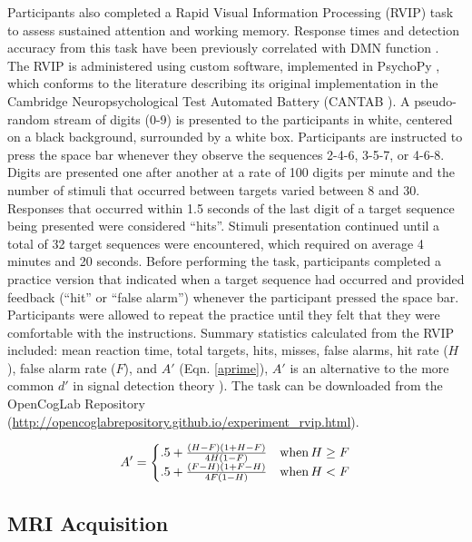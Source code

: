 Participants also completed a Rapid Visual Information Processing (RVIP) task to assess sustained attention and working memory. Response times and detection accuracy from this task have been previously correlated with DMN function \cite{Pagnoni2012}. The RVIP is administered using custom software, implemented in PsychoPy \cite{Peirce2008}, which conforms to the literature describing its original implementation in the Cambridge Neuropsychological Test Automated Battery (CANTAB \cite{Sahakian1992}). A pseudo-random stream of digits (0-9) is presented to the participants in white, centered on a black background, surrounded by a white box. Participants are instructed to press the space bar whenever they observe the sequences 2-4-6, 3-5-7, or 4-6-8. Digits are presented one after another at a rate of 100 digits per minute and the number of stimuli that occurred between targets varied between 8 and 30. Responses that occurred within 1.5 seconds of the last digit of a target sequence being presented were considered “hits”. Stimuli presentation continued until a total of 32 target sequences were encountered, which required on average 4 minutes and 20 seconds. Before performing the task, participants completed a practice version that indicated when a target sequence had occurred and provided feedback (“hit” or “false alarm”) whenever the participant pressed the space bar. Participants were allowed to repeat the practice until they felt that they were comfortable with the instructions. Summary statistics calculated from the RVIP included: mean reaction time, total targets, hits, misses, false alarms, hit rate ($H$), false alarm rate ($F$), and $A'$ (Eqn. \ref{aprime}), $A'$ is an alternative to the more common $d'$ in signal detection theory \cite{Stanislaw1999}). The task can be downloaded from the OpenCogLab Repository (\url{http://opencoglabrepository.github.io/experiment\_rvip.html}).

\begin{equation}
\label{aprime}
A'=\left\{
    \begin{matrix}
       .5 + \frac{(H-F)(1+H-F)}{4H(1-F)}  & \textup{when}  \, H\geq F  \\
       .5 + \frac{(F-H)(1+F-H)}{4F(1-H)}  & \textup{when}  \, H<  F  
    \end{matrix}
    \right.
\end{equation}

\subsection{MRI Acquisition}

